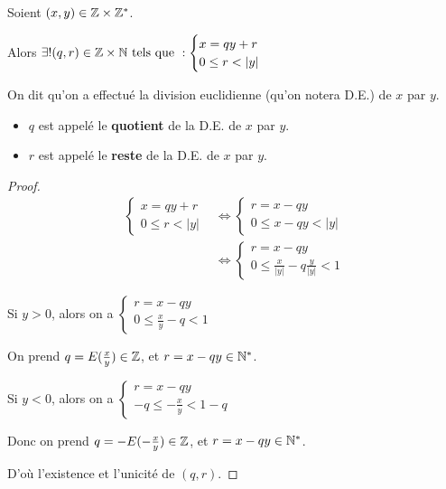 \documentclass[12pt,a4paper]{report}
\begin{document}
\begin{theorem}
    Soient $(x,y)\in\mathbb{Z}\times\mathbb{Z}^*$.

    Alors $\exists!(q,r)\in\mathbb{Z}\times\mathbb{N} \text{ tels que } : \begin{cases}
    x=qy+r\\
    0 \leq r < |y|
    \end{cases}$

    On dit qu'on a effectué la division euclidienne (qu'on notera D.E.) de $x$ par $y$.

    \begin{itemize}
        \item $q$ est appelé le \textbf{quotient} de la D.E. de $x$ par $y$.
        \item $r$ est appelé le \textbf{reste} de la D.E. de $x$ par $y$.
    \end{itemize}
    
\end{theorem}

\begin{proof}
    \begin{align*}
        \begin{cases}
            x = qy + r\\
            0 \leq r < |y|
        \end{cases} &\iff \begin{cases}
        r = x-qy\\
        0 \le x - qy < |y|
        \end{cases}\\
        &\iff \begin{cases}
        r = x - qy\\
        0 \le \frac{x}{|y|} - q \frac{y}{|y|} < 1
        \end{cases}
    \end{align*}

    Si $y > 0$, alors on a $\begin{cases}
    r = x-qy\\
    0 \le \frac{x}{y} - q < 1
    \end{cases}$

    On prend $q=E(\frac{x}{y}) \in \mathbb{Z}$, et $r = x-qy \in \mathbb{N}^*$.

    Si $y < 0$, alors on a $\begin{cases}
    r = x-qy\\
    -q \le -\frac{x}y < 1 - q
    \end{cases}$

    Donc on prend $q = -E(-\frac{x}{y}) \in \mathbb{Z}$, et $r = x-qy \in \mathbb{N}^*$.

    D'où l'existence et l'unicité de $(q,r)$.
\end{proof}
\end{document}
